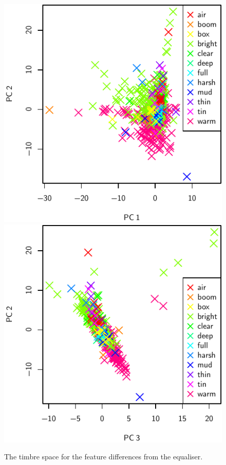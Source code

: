 			\begin{figure}[h!]
				\centering
				\subfloat
				{
					\includegraphics{chapter4/Images/EqualiserDifferencePCA1-2.pdf}
					\label{fig:EqualiserDifferencePCA1-2}
				}
				\quad
				\subfloat
				{
					\includegraphics{chapter4/Images/EqualiserDifferencePCA3-2.pdf}
					\label{fig:EqualiserDifferencePCA3-2}
				}
				\caption{The timbre space for the feature differences from the equaliser.}
				\label{fig:EqualiserDifferencePCAs}
			\end{figure}

